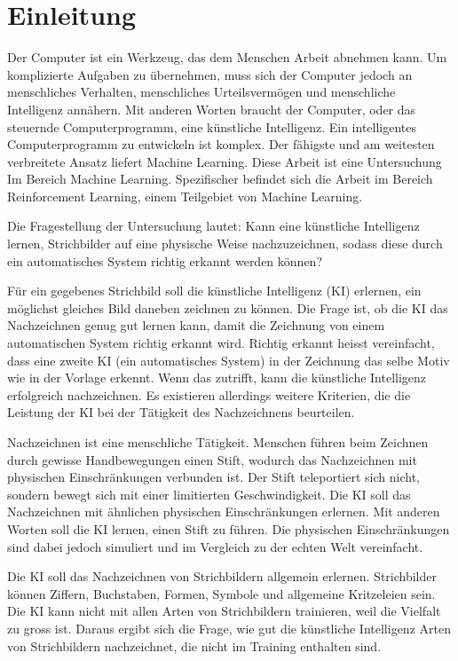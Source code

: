 \chapter{Einleitung}\label{chap:einleit}
Der Computer ist ein Werkzeug, das dem Menschen Arbeit abnehmen kann. Um
komplizierte Aufgaben zu übernehmen, muss sich der Computer jedoch an
menschliches Verhalten, menschliches Urteilsvermögen und menschliche Intelligenz
annähern. Mit anderen Worten braucht der Computer, oder das steuernde
Computerprogramm, eine künstliche Intelligenz. Ein intelligentes
Computerprogramm zu entwickeln ist komplex. Der fähigste und am weitesten
verbreitete Ansatz liefert Machine Learning. Diese Arbeit ist eine Untersuchung
Im Bereich Machine Learning. Spezifischer befindet sich die Arbeit im Bereich
Reinforcement Learning, einem Teilgebiet von Machine Learning.

Die Fragestellung der Untersuchung lautet: Kann eine künstliche Intelligenz
lernen, Strichbilder auf eine physische Weise nachzuzeichnen, sodass diese durch
ein automatisches System richtig erkannt werden können?

Für ein gegebenes Strichbild soll die künstliche Intelligenz (KI) erlernen, ein
möglichst gleiches Bild daneben zeichnen zu können. Die Frage ist, ob die KI das
Nachzeichnen genug gut lernen kann, damit die Zeichnung von einem automatischen
System richtig erkannt wird. Richtig erkannt heisst vereinfacht,
dass eine zweite KI (ein automatisches System) in der Zeichnung das selbe Motiv wie in der Vorlage erkennt.
Wenn das zutrifft, kann die künstliche Intelligenz erfolgreich nachzeichnen. Es
existieren allerdings weitere Kriterien, die die Leistung der KI bei der
Tätigkeit des Nachzeichnens beurteilen.

Nachzeichnen ist eine menschliche Tätigkeit. Menschen führen beim Zeichnen durch
gewisse Handbewegungen einen Stift, wodurch das Nachzeichnen mit physischen
Einschränkungen verbunden ist. Der Stift teleportiert sich nicht, sondern bewegt
sich mit einer limitierten Geschwindigkeit. Die KI soll das Nachzeichnen mit
ähnlichen physischen Einschränkungen erlernen. Mit anderen Worten soll die KI
lernen, einen Stift zu führen. Die physischen Einschränkungen sind dabei jedoch
simuliert und im Vergleich zu der echten Welt vereinfacht. 

Die KI soll das Nachzeichnen von Strichbildern allgemein erlernen. Strichbilder
können Ziffern, Buchstaben, Formen, Symbole und allgemeine Kritzeleien sein. Die
KI kann nicht mit allen Arten von Strichbildern trainieren, weil die Vielfalt zu
gross ist. Daraus ergibt sich die Frage, wie gut die künstliche Intelligenz
Arten von Strichbildern nachzeichnet, die nicht im Training enthalten sind.

